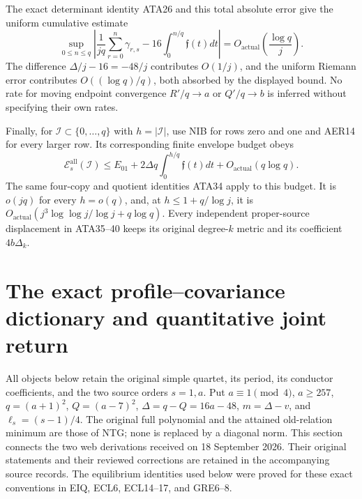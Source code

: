 \documentclass[11pt,a4paper]{article}
\begin{document}
The exact determinant identity ATA26 and this total absolute error
give the uniform cumulative estimate
\[
 \sup_{0\le n\le q}
 \left|\frac1{jq}\sum_{r=0}^n\gamma_{r,s}
               -16\int_0^{n/q}\mathfrak f(t)dt\right|
       =O_{\mathrm{actual}}\left(\frac{\log q}{j}\right).
                                                               \tag{AER21}
\]
The difference $\Delta/j-16=-48/j$ contributes $O(1/j)$,
and the uniform Riemann error contributes $O((\log q)/q)$,
both absorbed by the displayed bound.  No rate for moving
endpoint convergence $R'/q\to a$ or $Q'/q\to b$ is inferred
without specifying their own rates.

Finally, for $\mathscr I\subset\{0,\ldots,q\}$ with
$h=|\mathscr I|$, use NIB for rows zero and one and AER14 for
every larger row.  Its corresponding finite envelope budget obeys
\[
 \mathcal E_s^{\mathrm{all}}(\mathscr I)
 \le E_{01}+2\Delta q\int_0^{h/q}\mathfrak f(t)dt
                  +O_{\mathrm{actual}}(q\log q).        \tag{AER22}
\]
The same four-copy and quotient identities ATA34 apply to this
budget.  It is $o(jq)$ for every $h=o(q)$, and, at
$h\le1+q/\log j$, it is
$O_{\mathrm{actual}}(j^3\log\log j/\log j+q\log q)$.
Every independent proper-source displacement in ATA35--40 keeps
its original degree-$k$ metric and its coefficient $4b\Delta_k$.
\endgroup


\begingroup
\section{The exact profile--covariance dictionary and quantitative joint return}
\label{sec:PCB}

All objects below retain the original simple quartet, its period, its
conductor coefficients, and the two source orders $s=1,a$. Put
$a\equiv1\pmod4$, $a\ge257$, $q=(a+1)^2$, $Q=(a-7)^2$,
$\Delta=q-Q=16a-48$, $m=\Delta-v$, and $\ell_s=(s-1)/4$.
The original full polynomial and the attained old-relation minimum are
those of NTG; none is replaced by a diagonal norm. This section connects
the two web derivations received on 18 September 2026. Their original
statements and their reviewed corrections are retained in the accompanying
source records. The equilibrium identities used below were proved for
these exact conventions in EIQ, ECL6, ECL14--17, and GRE6--8.
\end{document}
